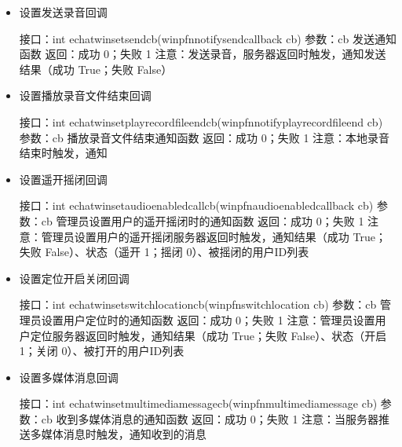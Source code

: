 \documentclass[letterpaper,10pt,english]{sphinxmanual}
\begin{document}
\begin{itemize}
\item {} 
设置发送录音回调

%
\begin{sphinxVerbatim}[commandchars=\\\{\}]
接口：int echat\PYGZus{}win\PYGZus{}set\PYGZus{}send\PYGZus{}cb(win\PYGZus{}pfn\PYGZus{}notify\PYGZus{}send\PYGZus{}callback cb)
参数：cb 发送通知函数
返回：成功 0；失败 \PYGZhy{}1
注意：发送录音，服务器返回时触发，通知发送结果（成功  True；失败  False）
\end{sphinxVerbatim}

\item {} 
设置播放录音文件结束回调

%
\begin{sphinxVerbatim}[commandchars=\\\{\}]
接口：int echat\PYGZus{}win\PYGZus{}set\PYGZus{}play\PYGZus{}recordfile\PYGZus{}end\PYGZus{}cb(win\PYGZus{}pfn\PYGZus{}notify\PYGZus{}play\PYGZus{}recordfile\PYGZus{}end cb)
参数：cb 播放录音文件结束通知函数
返回：成功 0；失败 \PYGZhy{}1
注意：本地录音结束时触发，通知
\end{sphinxVerbatim}

\item {} 
设置遥开摇闭回调

%
\begin{sphinxVerbatim}[commandchars=\\\{\}]
接口：int echat\PYGZus{}win\PYGZus{}set\PYGZus{}audio\PYGZus{}enabledcall\PYGZus{}cb(win\PYGZus{}pfn\PYGZus{}audio\PYGZus{}enabled\PYGZus{}callback cb)
参数：cb 管理员设置用户的遥开摇闭时的通知函数
返回：成功 0；失败 \PYGZhy{}1
注意：管理员设置用户的遥开摇闭服务器返回时触发，通知结果（成功  True；失败  False）、状态（遥开 1；摇闭 0）、被摇闭的用户ID列表
\end{sphinxVerbatim}

\item {} 
设置定位开启关闭回调

%
\begin{sphinxVerbatim}[commandchars=\\\{\}]
接口：int echat\PYGZus{}win\PYGZus{}set\PYGZus{}switch\PYGZus{}location\PYGZus{}cb(win\PYGZus{}pfn\PYGZus{}switch\PYGZus{}location cb)
参数：cb 管理员设置用户定位时的通知函数
返回：成功 0；失败 \PYGZhy{}1
注意：管理员设置用户定位服务器返回时触发，通知结果（成功  True；失败  False）、状态（开启 1；关闭 0）、被打开的用户ID列表
\end{sphinxVerbatim}

\item {} 
设置多媒体消息回调

%
\begin{sphinxVerbatim}[commandchars=\\\{\}]
接口：int echat\PYGZus{}win\PYGZus{}setmultimedia\PYGZus{}message\PYGZus{}cb(win\PYGZus{}pfn\PYGZus{}multimedia\PYGZus{}message cb)
参数：cb 收到多媒体消息的通知函数
返回：成功 0；失败 \PYGZhy{}1
注意：当服务器推送多媒体消息时触发，通知收到的消息
\end{sphinxVerbatim}

\end{itemize}
\end{document}
